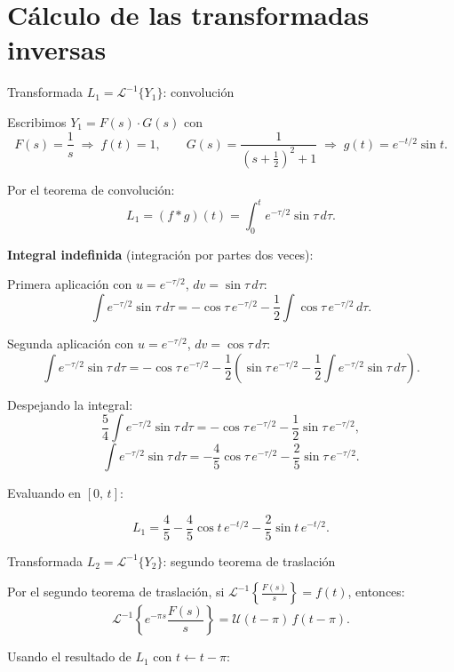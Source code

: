 \documentclass[12pt, a4paper]{article}
\newcommand{\ILap}{\mathcal{L}^{-1}}       %
\newcommand{\Uu}{\mathcal{U}}              %
\newcommand{\half}{\tfrac{1}{2}}
\newcommand{\sfrac}[2]{\tfrac{#1}{#2}}
\begin{document}
\section{Cálculo de las transformadas inversas}

\begin{stepbox}{Transformada $L_1 = \ILap\{Y_1\}$: convolución}

Escribimos $Y_1 = F(s)\cdot G(s)$ con
\[
  F(s) = \frac{1}{s} \;\Longrightarrow\; f(t) = 1,
  \qquad
  G(s) = \frac{1}{\left(s+\half\right)^{2}+1}
         \;\Longrightarrow\; g(t) = e^{-t/2}\sin t.
\]

Por el teorema de convolución:
\[
  L_1 = (f * g)(t) = \int_{0}^{t} e^{-\tau/2}\sin\tau\,d\tau.
\]

\textbf{Integral indefinida} (integración por partes dos veces):

Primera aplicación con $u = e^{-\tau/2}$, $dv = \sin\tau\,d\tau$:
\[
  \int e^{-\tau/2}\sin\tau\,d\tau
  = -\cos\tau\,e^{-\tau/2}
    - \frac{1}{2}\int \cos\tau\,e^{-\tau/2}\,d\tau.
\]

Segunda aplicación con $u = e^{-\tau/2}$, $dv = \cos\tau\,d\tau$:
\[
  \int e^{-\tau/2}\sin\tau\,d\tau
  = -\cos\tau\,e^{-\tau/2}
    - \frac{1}{2}\!\left(\sin\tau\,e^{-\tau/2}
    - \frac{1}{2}\int e^{-\tau/2}\sin\tau\,d\tau\right).
\]

Despejando la integral:
\[
  \frac{5}{4}\int e^{-\tau/2}\sin\tau\,d\tau
  = -\cos\tau\,e^{-\tau/2} - \frac{1}{2}\sin\tau\,e^{-\tau/2},
\]
\[
  \int e^{-\tau/2}\sin\tau\,d\tau
  = -\frac{4}{5}\cos\tau\,e^{-\tau/2} - \frac{2}{5}\sin\tau\,e^{-\tau/2}.
\]

Evaluando en $[0,\,t]$:
\end{stepbox}

\begin{resultbox}
\[
  L_1 = \frac{4}{5} - \frac{4}{5}\cos t\,e^{-t/2} - \frac{2}{5}\sin t\,e^{-t/2}.
\]
\end{resultbox}

\bigskip

\begin{stepbox}{Transformada $L_2 = \ILap\{Y_2\}$: segundo teorema de traslación}

Por el segundo teorema de traslación, si $\ILap\!\left\{\sfrac{F(s)}{s}\right\} = f(t)$, entonces:
\[
  \ILap\!\left\{e^{-\pi s}\frac{F(s)}{s}\right\} = \Uu(t-\pi)\,f(t-\pi).
\]

Usando el resultado de $L_1$ con $t \leftarrow t - \pi$:
\end{stepbox}
\end{document}
